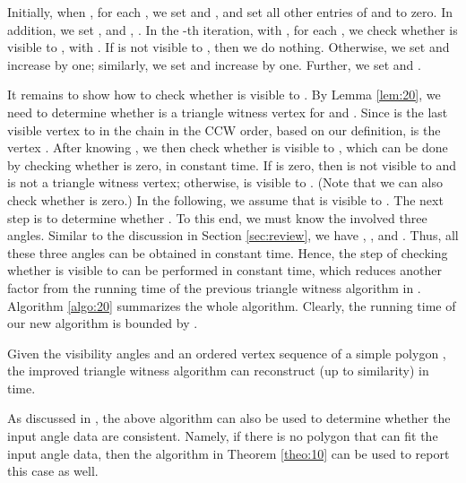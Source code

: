 \documentclass[11pt]{article}
\def\lemmaspace{\vspace*{0in}}
\begin{document}
Initially, when , for each , we set  and
, and set all other entries
of  and  to zero. In addition, we set
,  and , .  In the -th
iteration, with , for each , 
we check whether  is visible to ,
with . If  is not visible to , then we do nothing.
Otherwise, we set  and increase  by one;
similarly, we set  and increase  by one.
Further, we set  and . 

It remains to show how to check whether  is visible to . 
By Lemma \ref{lem:20}, we need to determine whether
 is a triangle witness vertex for  and . Since  is the last visible
vertex to  in the chain  in the CCW order, 
based on our definition,  is the vertex . After knowing
, we then check whether  is visible to , which can be
done by checking whether  is zero, in constant time. 
If  is
zero, then  is not visible to  and  is not a triangle
witness vertex; otherwise,  is visible to
. (Note that we can also check whether  is zero.)
In the following, we assume that  is visible to . The next step is
to determine whether  
.
To this end, we must know the involved three angles. Similar
to the discussion in Section \ref{sec:review}, we have 
, 
, and
. 
Thus, all these three angles can be
obtained in constant time. Hence, the step of checking whether 
is visible to  can be performed in constant time, which reduces
another  factor from the running time of the previous
triangle witness algorithm in \cite{ref:DisserRe10}.  
Algorithm \ref{algo:20} summarizes the whole algorithm. Clearly, the running
time of our new algorithm is bounded by . 

\lemmaspace
\begin{theorem}\label{theo:10}
Given the visibility angles and an ordered vertex sequence of a simple
polygon , the improved triangle witness algorithm can reconstruct
 (up to similarity) in  time. 
\end{theorem}
\lemmaspace

As discussed in \cite{ref:DisserRe10}, the above algorithm can also be used
to determine whether the input angle data are consistent. Namely, if
there is no polygon that can fit the input angle data, then 
the algorithm in Theorem \ref{theo:10} can be used to report this
case as well.
\end{document}
